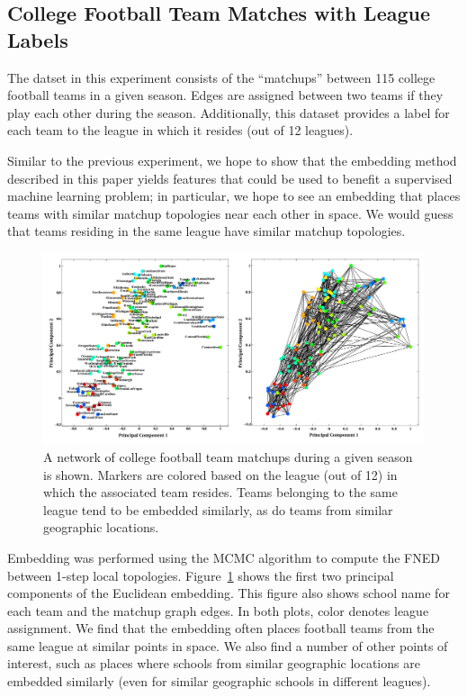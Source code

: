 \documentclass[10pt,twocolumn,fleqn]{article}
\begin{document}
\subsection{College Football Team Matches with League Labels}

The datset in this experiment consists of the ``matchups'' between 115 college football teams \cite{newman2006finding} in a given season. Edges are assigned between two teams if they play each other during the season. Additionally, this dataset provides a label for each team to the league in which it resides (out of 12 leagues). 

Similar to the previous experiment, we hope to show that the embedding method described in this paper yields features that could be used to benefit a supervised machine learning problem; in particular, we hope to see an embedding that places teams with similar matchup topologies near each other in space. We would guess that teams residing in the same league have similar matchup topologies.

\begin{figure}[!]
  \centering               
  \includegraphics[width=1\textwidth]{../img/demo7_footballTeams/footballFigure.pdf}
  \caption{A network of college football team matchups during a given season is shown. Markers are colored based on the league (out of 12) in which the associated team resides. Teams belonging to the same league tend to be embedded similarly, as do teams from similar geographic locations.}
  \label{fig:footballTeams}
\end{figure}

Embedding was performed using the MCMC algorithm to compute the FNED between 1-step local topologies. Figure~\ref{fig:footballTeams} shows the first two principal components of the Euclidean embedding. This figure also shows school name for each team and the matchup graph edges. In both plots, color denotes league assignment. We find that the embedding often places football teams from the same league at similar points in space. We also find a number of other points of interest, such as places where schools from similar geographic locations are embedded similarly (even for similar geographic schools in different leagues).
\end{document}
